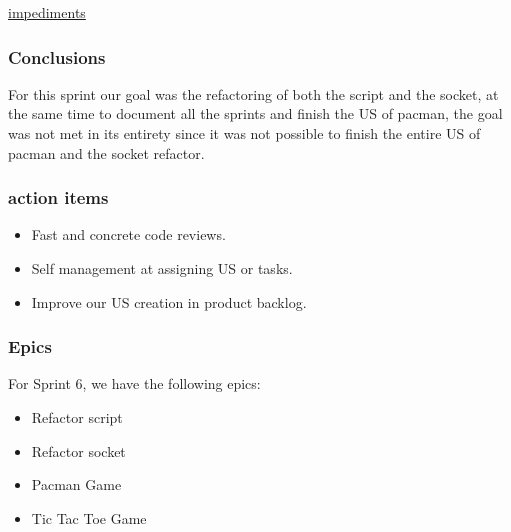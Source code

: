 \href{https://docs.google.com/spreadsheets/d/16zbS6L_JsIA9JhoJ1_e8Luk3MzKs8KApNbeizERjYn0/edit?usp=sharing}{impediments}

\subsubsection{Conclusions}
For this sprint our goal was the refactoring of both the script and the socket, at the same time to document all the sprints and finish the US of pacman, the goal was not met in its entirety since it was not possible to finish the entire US of pacman and the socket refactor. 

\subsubsection{action items}

\begin{itemize}
    \item Fast and concrete code reviews.
    \item Self management at assigning US or tasks.
    \item Improve our US creation in product backlog.
\end{itemize}


\subsubsection{Epics}

For Sprint 6, we have the following epics:

\begin{itemize}
    \item Refactor script
    \item Refactor socket
    \item Pacman Game
    \item Tic Tac Toe Game
\end{itemize}
